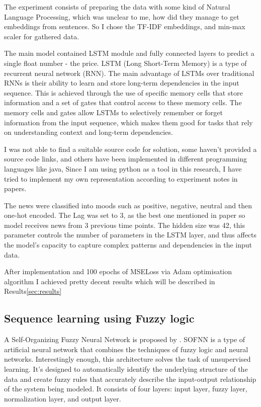 \documentclass{article}
\begin{document}
The experiment consists of preparing the data with some kind of Natural Language Processing, which was unclear to me, how did they manage to get embeddings from sentences. So I chose the TF-IDF embeddings, and min-max scaler for gathered data.

The main model contained LSTM \cite{HochSchm97} module and fully connected layers to predict a single float number - the price.
LSTM (Long Short-Term Memory) is a type of recurrent neural network (RNN). The main advantage of LSTMs over traditional RNNs is their ability to learn and store long-term dependencies in the input sequence. This is achieved through the use of specific memory cells that store information and a set of gates that control access to these memory cells. 
The memory cells and gates allow LSTMs to selectively remember or forget information from the input sequence, which makes them good for tasks that rely on understanding context and long-term dependencies.

I was not able to find a suitable source code for solution, some haven't provided a source code links, and others have been implemented in different programming languages like java, 
Since I am using python as a tool in this research, I have tried to implement my own representation according to experiment notes in papers.

The news were classified into moods such as positive, negative, neutral and then one-hot encoded.
The Lag was set to 3, as the best one mentioned in paper so model receives news from 3 previous time points. The hidden size was 42, this parameter controls the number of parameters in the LSTM layer, and thus affects the model's capacity to capture complex patterns and dependencies in the input data.

After implementation and 100 epochs of MSELoss via Adam optimisation algorithm I achieved pretty decent results which will be described in Results\ref{sec:results}

\subsection{Sequence learning using Fuzzy logic}

A Self-Organizing Fuzzy Neural Network is proposed by \newline \cite{SalimiBadr2022}.
SOFNN is a type of artificial neural network that combines the techniques of fuzzy logic and neural networks.
Interestingly enough, this architecture solves the task of unsupervised learning.
It's designed to automatically identify the underlying structure of the data and create fuzzy rules that accurately describe the input-output relationship of the system being modeled. It consists of four layers: input layer, fuzzy layer, normalization layer, and output layer.
\end{document}

